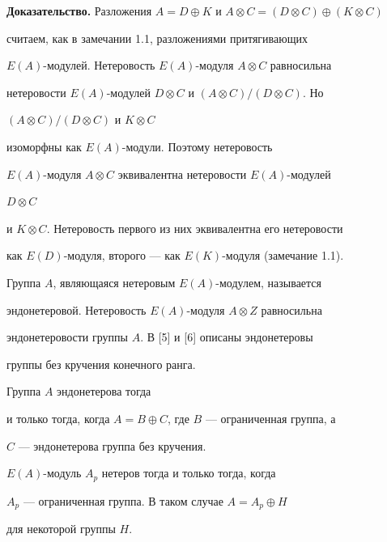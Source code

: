  


{\bf Доказательство.} Разложения $A=D\oplus K$ и $A\otimes C=(D\otimes 


C)\oplus(K\otimes C)$ 


считаем, как в замечании 1.1, разложениями притягивающих 


$E(A)$-модулей. Нетеровость $E(A)$-модуля $A\otimes C$ равносильна 


нетеровости $E(A)$-модулей $D\otimes C$ и $(A\otimes C)/(D\otimes C)$. Но 


$(A\otimes C)/(D\otimes C)$ и $K\otimes C$ 


изоморфны как $E(A)$-модули. Поэтому нетеровость 


$E(A)$-модуля $A\otimes C$ эквивалентна нетеровости $E(A)$-модулей 


$D\otimes C$ 


и $K\otimes C$. Нетеровость первого из них эквивалентна его нетеровости 


как $E(D)$-модуля, второго --- как $E(K)$-модуля (замечание 1.1). 


 


Группа $A$, являющаяся нетеровым $E(A)$-модулем, называется 


эндонетеровой. Нетеровость $E(A)$-модуля $A\otimes Z$ равносильна 


эндонетеровости группы $A$. В [5] и [6] описаны эндонетеровы 


группы без кручения конечного ранга. 


 


\begin{props} 


Группа $A$ эндонетерова тогда 


и только тогда, когда $A=B\oplus C$, где $B$ --- ограниченная группа, а 


$C$ --- эндонетерова группа без кручения. 


\end{props} 


 


\begin{cors} 


$E(A)$-модуль $A_p$ нетеров тогда и только тогда, когда 


$A_p$ --- ограниченная группа. В таком случае $A=A_p\oplus H$ 


для некоторой группы $H$. 


\end{cors} 


